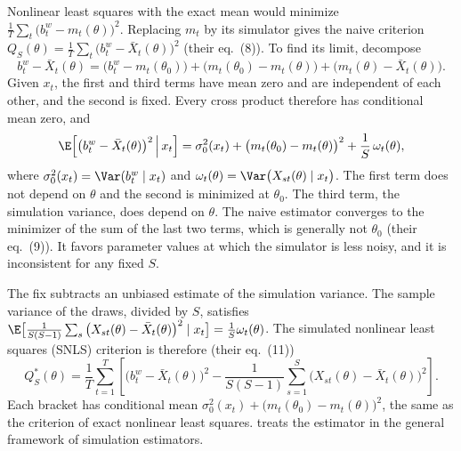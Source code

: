 Nonlinear least squares with the exact mean would minimize $\frac1T\sum_t\big(b^w_t-m_t(\theta)\big)^2$. Replacing
$m_t$ by its simulator gives the naive criterion $Q_S(\theta)=\frac1T\sum_t\big(b^w_t-\bar X_t(\theta)\big)^2$ (their
eq.~(8)). To find its limit, decompose
\[
b^w_t-\bar X_t(\theta)=\big(b^w_t-m_t(\theta_0)\big)+\big(m_t(\theta_0)-m_t(\theta)\big)+\big(m_t(\theta)-\bar X_t(\theta)\big).
\]
Given $x_t$, the first and third terms have mean zero and are independent of each other, and the second is fixed.
Every cross product therefore has conditional mean zero, and
\[
\E\Big[\big(b^w_t-\bar X_t(\theta)\big)^2\,\Big|\,x_t\Big]=\sigma_0^2(x_t)+\big(m_t(\theta_0)-m_t(\theta)\big)^2+\frac1S\,\omega_t(\theta),
\]
where $\sigma_0^2(x_t)=\Var(b^w_t\mid x_t)$ and $\omega_t(\theta)=\Var\big(X_{st}(\theta)\mid x_t\big)$. The first term does not
depend on $\theta$ and the second is minimized at $\theta_0$. The third term, the simulation variance, does depend on
$\theta$. The naive estimator converges to the minimizer of the sum of the last two terms, which is generally not
$\theta_0$ (their eq.~(9)). It favors parameter values at which the simulator is less noisy, and it is inconsistent for
any fixed $S$.

The fix subtracts an unbiased estimate of the simulation variance. The sample variance of the draws, divided by
$S$, satisfies $\E\big[\frac{1}{S(S-1)}\sum_s\big(X_{st}(\theta)-\bar X_t(\theta)\big)^2\mid x_t\big]=\frac1S\omega_t(\theta)$. The
simulated nonlinear least squares (SNLS) criterion is therefore (their eq.~(11))
\begin{equation}\label{eq:15-snls}
Q_S^*(\theta)=\frac1T\sum_{t=1}^T\left[\big(b^w_t-\bar X_t(\theta)\big)^2-\frac{1}{S(S-1)}\sum_{s=1}^S\big(X_{st}(\theta)-\bar X_t(\theta)\big)^2\right].
\end{equation}
Each bracket has conditional mean $\sigma_0^2(x_t)+\big(m_t(\theta_0)-m_t(\theta)\big)^2$, the same as the criterion of exact
nonlinear least squares.  treats the estimator in the general framework of simulation estimators.

